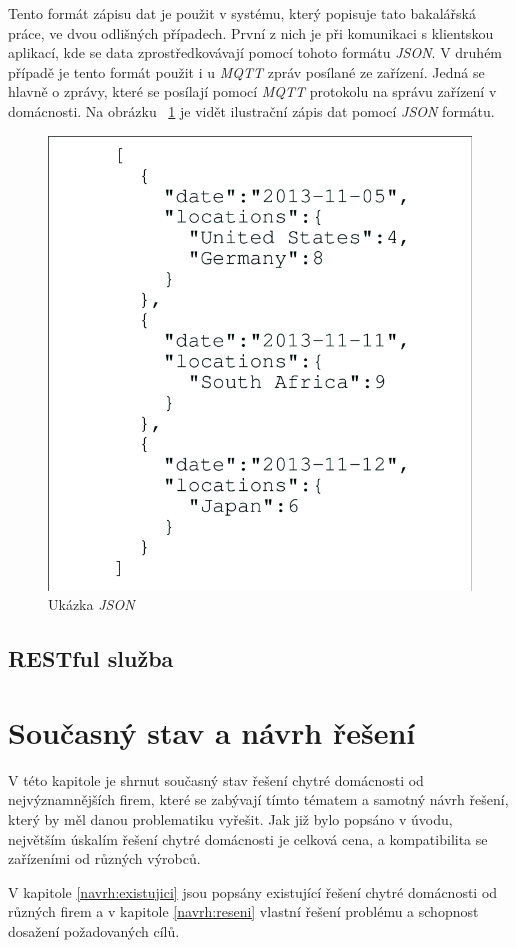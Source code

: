 Tento formát zápisu dat je použit v systému, který popisuje tato bakalářská práce, ve dvou odlišných případech. První z nich je při komunikaci s klientskou aplikací, kde se data zprostředkovávají pomocí tohoto formátu \emph{JSON}.
V druhém případě je tento formát použit i u \emph{MQTT} zpráv posílané ze zařízení. Jedná se hlavně o zprávy, které se posílají pomocí \emph{MQTT} protokolu na správu zařízení v domácnosti.
Na obrázku ~\ref{figure:json} je vidět ilustrační zápis dat pomocí \emph{JSON} formátu.

\begin{figure}[hbt]
  \centering
  \includegraphics[width=.6 \linewidth]{obrazky-figures/json_example.png}
  \caption{Ukázka \emph{JSON}}
  \label{figure:json}
\end{figure}

\section{RESTful služba}
\label{terminy:restful}

\chapter{Současný stav a návrh řešení}
\label{navrh}

V této kapitole je shrnut současný stav řešení chytré domácnosti od nejvýznamnějších firem, které se zabývají tímto tématem a samotný návrh řešení, který by měl danou problematiku vyřešit.
Jak již bylo popsáno v úvodu, největším úskalím řešení chytré domácnosti je celková cena, a kompatibilita se zařízeními od různých výrobců.

V kapitole \ref{navrh:existujici} jsou popsány existující řešení chytré domácnosti od různých firem a v kapitole \ref{navrh:reseni} vlastní řešení problému a schopnost dosažení požadovaných cílů.


